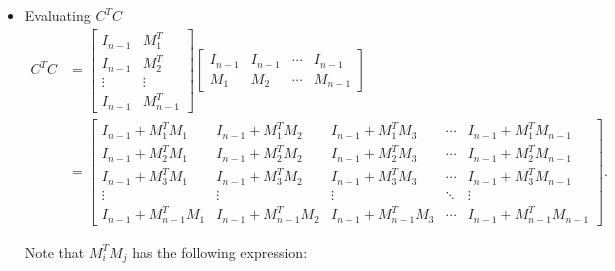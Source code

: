 \begin{itemize}
    \item Evaluating $C^TC$
    \begin{align*}
        C^TC &=
        \begin{bmatrix}
            I_{n-1} & M_1^T \\
            I_{n-1} & M_2^T \\
            \vdots & \vdots \\
            I_{n-1} & M_{n-1}^T
        \end{bmatrix} 
        \begin{bmatrix}
            I_{n-1} & I_{n-1} & \cdots & I_{n-1} \\
            M_1 & M_2 & \cdots & M_{n-1}
        \end{bmatrix} \\
        &= 
        \begin{bmatrix}
            I_{n-1} + M_1^TM_1 & I_{n-1} + M_1^TM_2 & I_{n-1} + M_1^TM_3 & \cdots & I_{n-1} + M_1^TM_{n-1} \\
            I_{n-1} + M_2^TM_1 & I_{n-1} + M_2^TM_2 & I_{n-1} + M_2^TM_3 & \cdots & I_{n-1} + M_2^TM_{n-1} \\
            I_{n-1} + M_3^TM_1 & I_{n-1} + M_3^TM_2 & I_{n-1} + M_3^TM_3 & \cdots & I_{n-1} + M_3^TM_{n-1} \\
            \vdots & \vdots & \vdots & \ddots & \vdots \\
            I_{n-1} + M_{n-1}^TM_1 & I_{n-1} + M_{n-1}^TM_2 & I_{n-1} + M_{n-1}^TM_3 & \cdots & I_{n-1} + M_{n-1}^TM_{n-1} 
        \end{bmatrix}.
    \end{align*}

    Note that $M_{i}^TM_{j}$ has the following expression:
    

\end{itemize}
